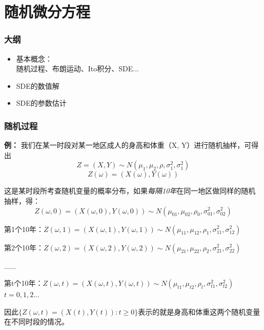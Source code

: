 \section{随机微分方程}
 \begin{frame}

\frametitle{大纲}

\begin{itemize}
	\item 基本概念：\\
	随机过程、布朗运动、Ito积分、SDE...
	\item SDE的数值解
	\item SDE的参数估计
	
\end{itemize}



\end{frame}



\begin{frame}

\frametitle{随机过程}
\small

\textbf{例：} 我们在某一时段对某一地区成人的身高和体重（X, Y）进行随机抽样，可得出 
$$Z = (X,Y) \sim N(\mu_1,\mu_2,\rho,\sigma^2_1,\sigma^2_1)$$
$$Z(\omega) = (X(\omega),Y(\omega))$$

这是某时段所考查随机变量的概率分布，如果\textit{每隔10年}在同一地区做同样的随机抽样，得： \\
$$Z(\omega,0)=(X(\omega,0),Y(\omega,0)) \sim N(\mu_{01},\mu_{02},\rho_0,\sigma^2_{01},\sigma^2_{02})$$

第1个10年：$Z(\omega,1)=(X(\omega,1),Y(\omega,1)) \sim N(\mu_{11},\mu_{12},\rho_1,\sigma^2_{11},\sigma^2_{12})$

第2个10年：$Z(\omega,2)=(X(\omega,2),Y(\omega,2)) \sim N(\mu_{21},\mu_{22},\rho_2,\sigma^2_{21},\sigma^2_{22})$

......

第t个10年：$Z(\omega,t)=(X(\omega,t),Y(\omega,t)) \sim N(\mu_{t1},\mu_{t2},\rho_t,\sigma^2_{t1},\sigma^2_{t2})$ $t = 0,1,2...$

因此$\{Z(\omega,t)=(X(t),Y(t)): t \geq 0\}$表示的就是身高和体重这两个随机变量在不同时段的情况。


\end{frame}


